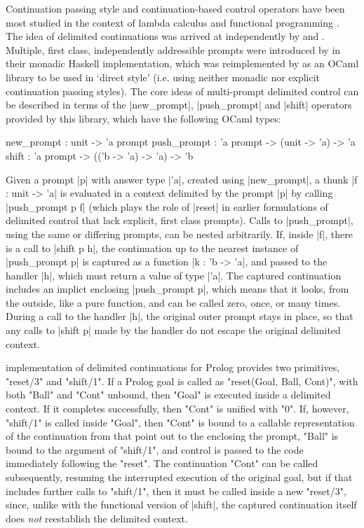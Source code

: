 Continuation passing style and continuation-based control operators have been most studied in the
context of lambda calculus and functional programming \citep{SussmanSteele1975}.
The idea of delimited continuations was arrived at independently by \cite{Felleisen1988} and
\cite{DanvyFilinski1990}. Multiple, first class, independently addressible prompts were introduced
by \cite{DyvbigJonesSabry2005} in their monadic Haskell implementation, which was reimplemented
by \cite{Kiselyov2012} as an OCaml library to be used in `direct style'
(i.e. using neither monadic nor explicit continuation passing styles). The core ideas of multi-prompt delimited
control can be described in terms of the |new_prompt|, |push_prompt| and |shift| operators provided by
this library, which have the following OCaml types:
\begin{ocamlet}
	new_prompt	: unit -> 'a prompt
	push_prompt	: 'a prompt -> (unit -> 'a) -> 'a
	shift        : 'a prompt -> (('b -> 'a) -> 'a) -> 'b
\end{ocamlet}
Given a prompt |p| with answer type |'a|, created using |new_prompt|, a thunk |f : unit -> 'a| is evaluated
in a context delimited by the
prompt |p| by calling |push_prompt p f| (which plays the role of |reset| in earlier
formulations of delimited control that lack explicit, first class prompts).
Calls to |push_prompt|, using the same or differing prompts, can be nested arbitrarily.
If, inside |f|, there is a call to |shift p h|, the
continuation up to the nearest instance of |push_prompt p| is captured as a function |k : 'b -> 'a|, and passed to the handler
|h|, which must return a value of type |'a|. The captured continuation includes an implict
enclosing |push_prompt p|, which means that it looks, from the outside,
like a pure function, and can be called zero, once, or many times. During a call to the handler |h|,
the original outer prompt stays in place, so that any calls to |shift p| made by the handler do not
escape the original delimited context.

 implementation of delimited continuations for Prolog provides two
primitives, "reset/3" and "shift/1". If a Prolog goal is called as "reset(Goal, Ball, Cont)", with both
"Ball" and "Cont" unbound, then "Goal" is executed inside a delimited context. If it completes
successfully, then "Cont" is unified with "0".  If, however, "shift/1" is called inside "Goal", then "Cont" is bound
to a callable representation of the continuation from that point out to the enclosing the prompt, "Ball"
is bound to the argument of "shift/1", and control is passed to the code immediately following the "reset".
The continuation "Cont" can be called subsequently, resuming the interrupted execution of the original
goal, but if that includes further calls to "shift/1", then it must be called inside a new
"reset/3", since, unlike with the functional version of |shift|, the captured continuation itself
does \emph{not} reestablish the delimited context.

